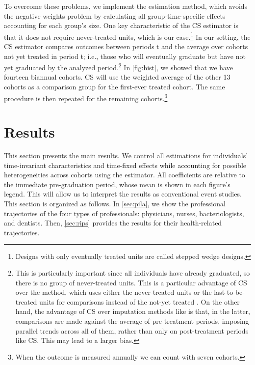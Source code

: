 \documentclass[12pt, a4paper]{article}
\begin{document}
To overcome these problems, we implement the \citet{callaway2021difference} estimation method, which avoids the negative weights problem by calculating all group-time-specific effects accounting for each group's size. One key characteristic of the CS estimator is that it does not require never-treated units, which is our case.\footnote{Designs with only eventually treated units are called stepped wedge designs.} In our setting, the CS estimator compares outcomes between periods t and the average over cohorts not yet treated in period t; i.e., those who will eventually graduate but have not yet graduated by the analyzed period.\footnote{This is particularly important since all individuals have already graduated, so there is no group of never-treated units. This is a particular advantage of CS over the \citet{sun2020csdid} method, which uses either the never-treated units or the last-to-be-treated units for comparisons instead of the not-yet treated \citep{roth2023whats}. On the other hand, the advantage of CS over imputation methods like \citet{borusyak2023revisiting} is that, in the latter, comparisons are made against the average of pre-treatment periods, imposing parallel trends across all of them, rather than only on post-treatment periods like CS. This may lead to a larger bias.} In \autoref{fig:hist}, we showed that we have fourteen biannual cohorts. CS will use the weighted average of the other 13 cohorts as a comparison group for the first-ever treated cohort. The same procedure is then repeated for the remaining cohorts.\footnote{When the outcome is measured annually we can count with seven cohorts.} 


\section{Results} \label{sec:results}

This section presents the main results. We control all estimations for individuals' time-invariant characteristics and time-fixed effects while accounting for possible heterogeneities across cohorts using the \citet{callaway2021difference} estimator. All coefficients are relative to the immediate pre-graduation period, whose mean is shown in each figure's legend. This will allow us to interpret the results as conventional event studies. This section is organized as follows. In \autoref{sec:pila}, we show the professional trajectories of the four types of professionals: physicians, nurses, bacteriologists, and dentists. Then, \autoref{sec:rips} provides the results for their health-related trajectories.
\end{document}
